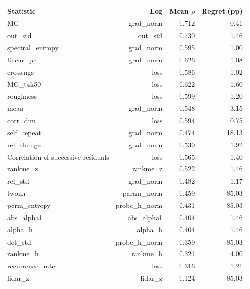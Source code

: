 \begin{tabular}{lrrr}
\toprule
Statistic & Log & Mean $\rho$ & Regret (pp) \\
\midrule
MG & grad\_norm & 0.712 & 0.41 \\
out\_std & out\_std & 0.730 & 1.46 \\
spectral\_entropy & grad\_norm & 0.595 & 1.00 \\
linear\_pr & grad\_norm & 0.626 & 1.08 \\
crossings & loss & 0.586 & 1.02 \\
MG\_t4k50 & loss & 0.622 & 1.60 \\
roughness & loss & 0.599 & 1.20 \\
mean & grad\_norm & 0.548 & 3.15 \\
corr\_dim & loss & 0.594 & 0.75 \\
self\_repeat & grad\_norm & 0.474 & 18.13 \\
rel\_change & grad\_norm & 0.539 & 1.92 \\
Correlation of successive residuals & loss & 0.565 & 1.40 \\
rankme\_z & rankme\_z & 0.522 & 1.46 \\
rel\_std & grad\_norm & 0.482 & 1.17 \\
twonn & param\_norm & 0.459 & 85.03 \\
perm\_entropy & probe\_h\_norm & 0.431 & 85.03 \\
abs\_alpha1 & abs\_alpha1 & 0.404 & 1.46 \\
alpha\_h & alpha\_h & 0.404 & 1.46 \\
det\_std & probe\_h\_norm & 0.359 & 85.03 \\
rankme\_h & rankme\_h & 0.321 & 4.00 \\
recurrence\_rate & loss & 0.316 & 1.21 \\
lidar\_z & lidar\_z & 0.124 & 85.03 \\
\bottomrule
\end{tabular}
